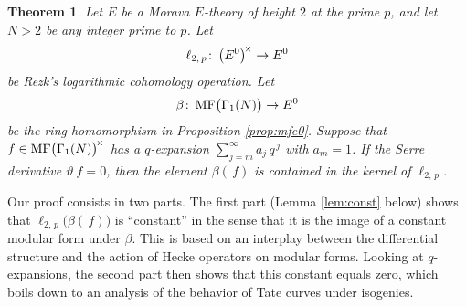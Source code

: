 \documentclass{gtpart}
\newtheorem{thm}{Theorem}
\theoremstyle{definition}
\theoremstyle{remark}
\def\co{\colon\thinspace}
\newcommand{\MF}{{\rm MF}}
\newcommand{\B}{\beta}
\newcommand{\G}{\Gamma}
\renewcommand{\=}{\approx}
\renewcommand{\-}{\sim}
\numberwithin{equation}{section}
\numberwithin{thm}{section}
\begin{document}
\begin{thm}
 \label{thm:kerlog}
 Let $E$ be a Morava $E$-theory of height $2$ at the prime $p$, and let $N > 2$ be any integer prime to $p$.  
 Let 
 \[
  \ell_{2,\,p} \co \big( E^0 \big)^{\!\times} \to E^0 
 \]
 be Rezk's logarithmic cohomology operation.  
 Let 
 \[
  \B \co \MF\big(\G_1(N)\big) \to E^0 
 \]
 be the ring homomorphism in Proposition \ref{prop:mfe0}.  
 Suppose that \!\, $f \in \MF\big(\G_1(N)\big)^{\!\times}$ has a $q$-expansion $\sum_{j = m}^\infty a_j \, q^{\,j}$ with $a_m = 1$.  
 If the Serre derivative $\vartheta ~\! f = 0$, then 
 the element $\B(\,f)$ is contained in the kernel of $\ell_{2,\,p}$.  
\end{thm}
Our proof consists in two parts.  
The first part (Lemma \ref{lem:const} below) shows that $\ell_{2,\,p}\big(\B(\,f)\big)$ is ``constant'' in the sense that it is the image of a constant modular form under $\B$.  
This is based on an interplay between the differential structure and the action of Hecke operators on modular forms.  
Looking at $q$-expansions, the second part then shows that this constant equals zero, which boils down to an analysis of the behavior of Tate curves under isogenies.  
\end{document}
